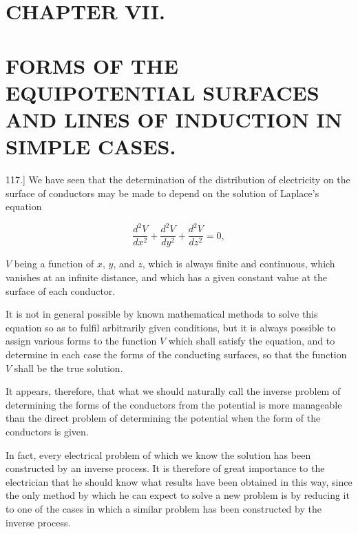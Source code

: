 \documentclass[11pt,a4paper]{article}
\begin{document}
\section*{CHAPTER VII.}

\section*{FORMS OF THE EQUIPOTENTIAL SURFACES AND LINES OF INDUCTION IN SIMPLE CASES.}

117.] We have seen that the determination of the distribution of electricity on the surface of conductors may be made to depend on the solution of Laplace's equation

\[
\frac{d^2V}{dx^2} + \frac{d^2V}{dy^2} + \frac{d^2V}{dz^2} = 0,
\]

$V$ being a function of $x$, $y$, and $z$, which is always finite and continuous, which vanishes at an infinite distance, and which has a given constant value at the surface of each conductor.

It is not in general possible by known mathematical methods to solve this equation so as to fulfil arbitrarily given conditions, but it is always possible to assign various forms to the function $V$ which shall satisfy the equation, and to determine in each case the forms of the conducting surfaces, so that the function $V$ shall be the true solution.

It appears, therefore, that what we should naturally call the inverse problem of determining the forms of the conductors from the potential is more manageable than the direct problem of determining the potential when the form of the conductors is given.

In fact, every electrical problem of which we know the solution has been constructed by an inverse process. It is therefore of great importance to the electrician that he should know what results have been obtained in this way, since the only method by which he can expect to solve a new problem is by reducing it to one of the cases in which a similar problem has been constructed by the inverse process.
\end{document}
